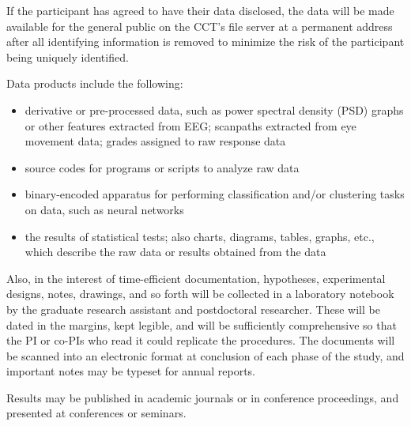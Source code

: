 \documentclass[hidelinks,11pt]{article}
\begin{document}
If the participant has agreed to have their data disclosed, the data will be
made available for the general public on the CCT's file server at a permanent
address after all identifying information is removed to minimize the risk of
the participant being uniquely identified.

Data products include the following:

\begin{itemize}

\item derivative or pre-processed data, such as power spectral density (PSD)
graphs or other features extracted from EEG; scanpaths extracted from eye
movement data; grades assigned to raw response data 

\item source codes for programs or scripts to analyze raw data

\item binary-encoded apparatus for performing classification and/or clustering
tasks on data, such as neural networks

\item the results of statistical tests; also charts, diagrams, tables, graphs,
etc., which describe the raw data or results obtained from the data

\end{itemize}

Also, in the interest of time-efficient documentation, hypotheses, experimental
designs, notes, drawings, and so forth will be collected in a laboratory
notebook by the graduate research assistant and postdoctoral researcher. These
will be dated in the margins, kept legible, and will be sufficiently
comprehensive so that the PI or co-PIs who read it could replicate the
procedures. The documents will be scanned into an electronic format at
conclusion of each phase of the study, and important notes may be typeset for
annual reports.

Results may be published in academic journals or in conference proceedings,
and presented at conferences or seminars.
\end{document}
